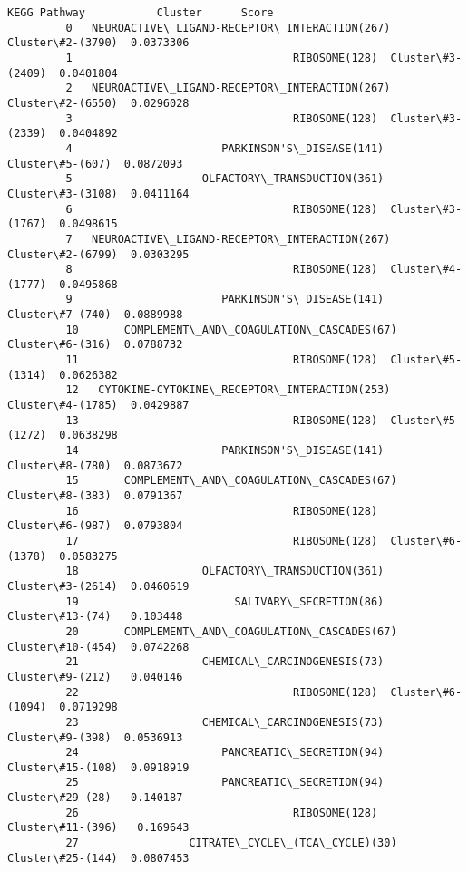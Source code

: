 \documentclass[11pt]{article}
\begin{document}
\begin{Verbatim}[commandchars=\\\{\}]
                                             KEGG Pathway           Cluster      Score  
         0   NEUROACTIVE\_LIGAND-RECEPTOR\_INTERACTION(267)  Cluster\#2-(3790)  0.0373306  
         1                                  RIBOSOME(128)  Cluster\#3-(2409)  0.0401804  
         2   NEUROACTIVE\_LIGAND-RECEPTOR\_INTERACTION(267)  Cluster\#2-(6550)  0.0296028  
         3                                  RIBOSOME(128)  Cluster\#3-(2339)  0.0404892  
         4                       PARKINSON'S\_DISEASE(141)   Cluster\#5-(607)  0.0872093  
         5                    OLFACTORY\_TRANSDUCTION(361)  Cluster\#3-(3108)  0.0411164  
         6                                  RIBOSOME(128)  Cluster\#3-(1767)  0.0498615  
         7   NEUROACTIVE\_LIGAND-RECEPTOR\_INTERACTION(267)  Cluster\#2-(6799)  0.0303295  
         8                                  RIBOSOME(128)  Cluster\#4-(1777)  0.0495868  
         9                       PARKINSON'S\_DISEASE(141)   Cluster\#7-(740)  0.0889988  
         10       COMPLEMENT\_AND\_COAGULATION\_CASCADES(67)   Cluster\#6-(316)  0.0788732  
         11                                 RIBOSOME(128)  Cluster\#5-(1314)  0.0626382  
         12   CYTOKINE-CYTOKINE\_RECEPTOR\_INTERACTION(253)  Cluster\#4-(1785)  0.0429887  
         13                                 RIBOSOME(128)  Cluster\#5-(1272)  0.0638298  
         14                      PARKINSON'S\_DISEASE(141)   Cluster\#8-(780)  0.0873672  
         15       COMPLEMENT\_AND\_COAGULATION\_CASCADES(67)   Cluster\#8-(383)  0.0791367  
         16                                 RIBOSOME(128)   Cluster\#6-(987)  0.0793804  
         17                                 RIBOSOME(128)  Cluster\#6-(1378)  0.0583275  
         18                   OLFACTORY\_TRANSDUCTION(361)  Cluster\#3-(2614)  0.0460619  
         19                        SALIVARY\_SECRETION(86)   Cluster\#13-(74)   0.103448  
         20       COMPLEMENT\_AND\_COAGULATION\_CASCADES(67)  Cluster\#10-(454)  0.0742268  
         21                   CHEMICAL\_CARCINOGENESIS(73)   Cluster\#9-(212)   0.040146  
         22                                 RIBOSOME(128)  Cluster\#6-(1094)  0.0719298  
         23                   CHEMICAL\_CARCINOGENESIS(73)   Cluster\#9-(398)  0.0536913  
         24                      PANCREATIC\_SECRETION(94)  Cluster\#15-(108)  0.0918919  
         25                      PANCREATIC\_SECRETION(94)   Cluster\#29-(28)   0.140187  
         26                                 RIBOSOME(128)  Cluster\#11-(396)   0.169643  
         27                 CITRATE\_CYCLE\_(TCA\_CYCLE)(30)  Cluster\#25-(144)  0.0807453  

\end{Verbatim}
\end{document}
